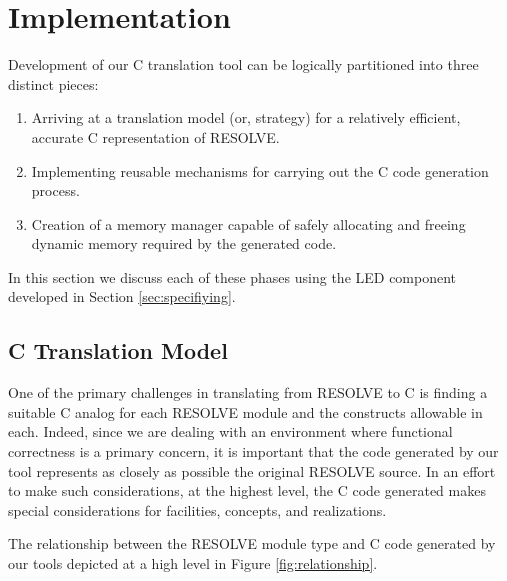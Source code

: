 \section{Implementation}
Development of our C translation tool can be logically partitioned into three distinct pieces: 
\begin{enumerate}
\item Arriving at a translation model (or, strategy) for a relatively efficient, accurate C representation of RESOLVE.
\item Implementing reusable mechanisms for carrying out the C code generation process.
\item Creation of a memory manager capable of safely allocating and freeing dynamic memory required by the generated code.
\end{enumerate}
In this section we discuss each of these phases using the LED component developed in Section \ref{sec:specifiying}.

\subsection{C Translation Model}
One of the primary challenges in translating from RESOLVE to C is finding a suitable C analog for each RESOLVE module and the constructs allowable in each. Indeed, since we are dealing with an environment where functional correctness is a primary concern, it is important that the code generated by our tool represents as closely as possible the original RESOLVE source. In an effort to make such considerations, at the highest level, the C code generated makes special considerations for facilities, concepts, and realizations. 

The relationship between the RESOLVE module type and C code generated by our tools depicted at a high level in Figure \ref{fig:relationship}. 

